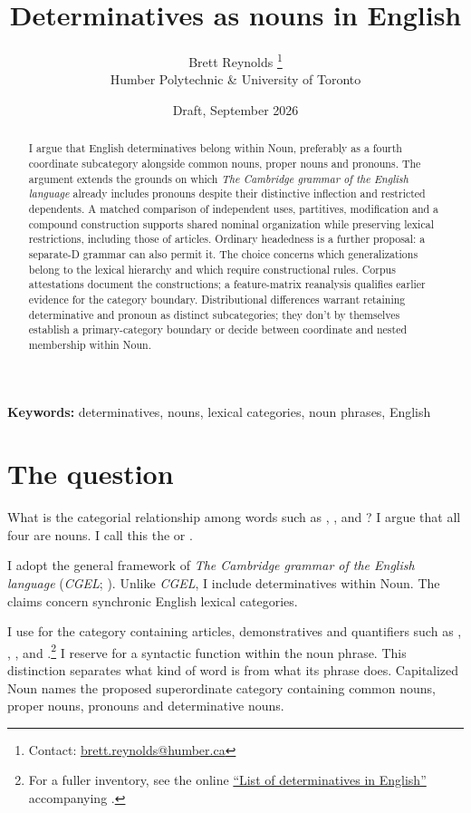 \documentclass[12pt]{article}
\title{Determinatives as nouns in English}
\author{Brett Reynolds \orcidlink{0000-0003-0073-7195}%
\thanks{Contact: \href{mailto:brett.reynolds@humber.ca}{brett.reynolds@humber.ca}}\\
Humber Polytechnic \& University of Toronto}
\date{Draft, September 2026}
\begin{document}
\maketitle

\begin{abstract}
I argue that English determinatives belong within Noun, preferably as a fourth coordinate subcategory alongside common nouns, proper nouns and pronouns. The argument extends the grounds on which \textit{The Cambridge grammar of the English language} already includes pronouns despite their distinctive inflection and restricted dependents. A matched comparison of independent uses, partitives, modification and a compound construction supports shared nominal organization while preserving lexical restrictions, including those of articles. Ordinary headedness is a further proposal: a separate-D grammar can also permit it. The choice concerns which generalizations belong to the lexical hierarchy and which require constructional rules. Corpus attestations document the constructions; a feature-matrix reanalysis qualifies earlier evidence for the category boundary. Distributional differences warrant retaining determinative and pronoun as distinct subcategories; they don't by themselves establish a primary-category boundary or decide between coordinate and nested membership within Noun.
\end{abstract}

\noindent\textbf{Keywords:} determinatives, nouns, lexical categories, noun phrases, English

\section{The question}\label{sec:intro}

What is the categorial relationship among words such as , ,  and ? I argue that all four are nouns. I call this the  or .

I adopt the general framework of \textit{The Cambridge grammar of the English language} (\textit{CGEL}; \citealt{huddleston2002}). Unlike \textit{CGEL}, I include determinatives within Noun. The claims concern synchronic English lexical categories.

I use  for the category containing articles, demonstratives and quantifiers such as , , ,  and .\footnote{For a fuller inventory, see the online \href{https://www.cambridge.org/highereducation/api/resources/2AC8DF5CA558F8A6FCDFACD0EAF8EA08}{\enquote{List of determinatives in English}} accompanying \textcite{Huddleston2021}.} I reserve  for a syntactic function within the noun phrase. This distinction separates what kind of word  is from what its phrase does. Capitalized Noun names the proposed superordinate category containing common nouns, proper nouns, pronouns and determinative nouns.
\end{document}
